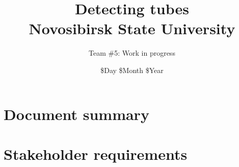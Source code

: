 \documentclass[14pt]{report}
\title{
	{Detecting tubes} \\ %
	{\large Novosibirsk State University} \\
}
\author{Team \#5: Work in progress}
\date{\$Day \$Month \$Year}
\begin{document}
	
\maketitle
\tableofcontents


\chapter{Document summary}

\thispagestyle{fancy}



\chapter{Stakeholder requirements}

\thispagestyle{fancy}

\end{document}
